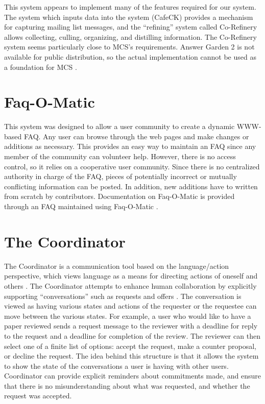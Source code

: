 This system appears to implement many of the features required for our system.
The system which inputs data into the system (CafeCK) provides a mechanism for
capturing mailing list messages, and the ``refining'' system called Co-Refinery
allows collecting, culling, organizing, and distilling information. The
Co-Refinery system seems particularly close to MCS's requirements. Answer
Garden 2 is not available for public distribution, so the actual implementation
cannot be used as a foundation for MCS \cite{ackerman-email}.

\section{Faq-O-Matic}
This system was designed to allow a user community to create a dynamic
WWW-based FAQ. Any user can browse through the web pages and make changes or
additions as necessary.  This provides an easy way to maintain an FAQ since any
member of the community can volunteer help. However, there is no access
control, so it relies on a cooperative user community. Since there is no
centralized authority in charge of the FAQ, pieces of potentially incorrect or
mutually conflicting information can be posted. In addition, new additions have
to written from scratch by contributors. Documentation on Faq-O-Matic is
provided through an FAQ maintained using Faq-O-Matic
\cite{faq-o-matic-website}.

\section{The Coordinator}
The Coordinator is a communication tool based on the language/action
perspective, which views language as a means for directing actions of oneself
and others \cite{Winograd87}. The Coordinator attempts to enhance human
collaboration by explicitly supporting ``conversations'' such as requests and
offers \cite{Winograd:1988:WAG}. The conversation is viewed as having various
states and actions of the requester or the requestee can move between the
various states. For example, a user who would like to have a paper reviewed
sends a request message to the reviewer with a deadline for reply to the
request and a deadline for completion of the review.  The reviewer can then
select one of a finite list of options: accept the request, make a counter
proposal, or decline the request. The idea behind this structure is that it
allows the system to show the state of the conversations a user is having with
other users. Coordinator can provide explicit reminders about commitments made,
and ensure that there is no misunderstanding about what was requested, and
whether the request was accepted.

